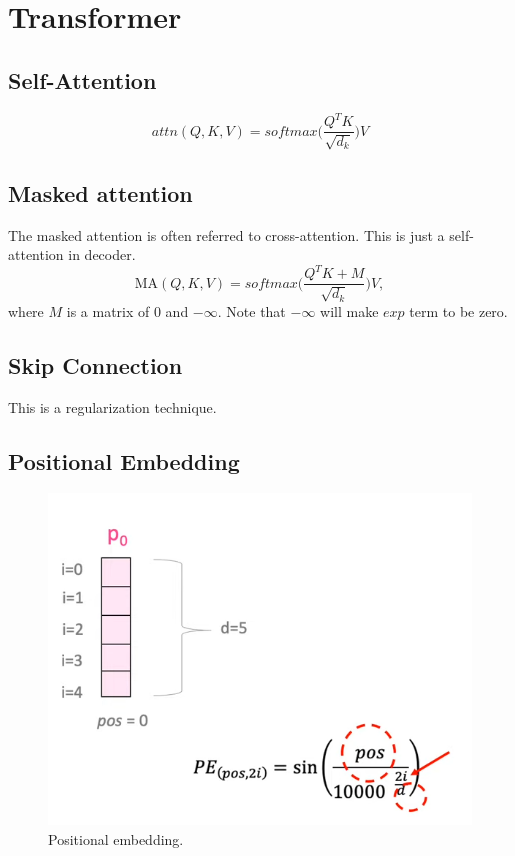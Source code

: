 \section{Transformer}
\label{sec:nlp_transformer}


\subsection{Self-Attention}
$$attn(Q,K,V) = softmax\bigg(\frac{Q^TK}{\sqrt{d_k}}\bigg)V$$

\subsection{Masked attention}
The masked attention is often referred to cross-attention. This is just a self-attention in decoder.
$$\textrm{MA}(Q,K,V) = softmax\bigg(\frac{Q^TK+M}{\sqrt{d_k}}\bigg)V,$$
where $M$ is a matrix of 0 and $-\infty$. Note that $-\infty$ will make $exp$ term to be zero.

\subsection{Skip Connection}
This is a regularization technique.

\subsection{Positional Embedding}

\begin{figure}[t]
	\centering
	\includegraphics[scale=0.6]{./images/transformer/positional_1.png}
	\caption{Positional embedding.}
\end{figure}


